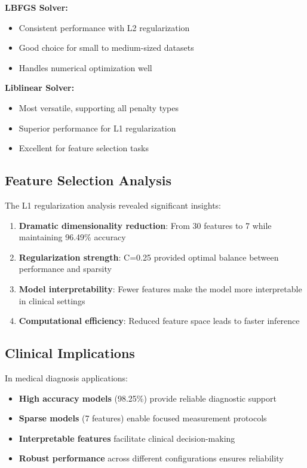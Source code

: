 \documentclass[12pt,a4paper]{article}
\begin{document}
\textbf{LBFGS Solver:}
\begin{itemize}
    \item Consistent performance with L2 regularization
    \item Good choice for small to medium-sized datasets
    \item Handles numerical optimization well
\end{itemize}

\textbf{Liblinear Solver:}
\begin{itemize}
    \item Most versatile, supporting all penalty types
    \item Superior performance for L1 regularization
    \item Excellent for feature selection tasks
\end{itemize}

\subsection{Feature Selection Analysis}

The L1 regularization analysis revealed significant insights:

\begin{enumerate}
    \item \textbf{Dramatic dimensionality reduction}: From 30 features to 7 while maintaining 96.49\% accuracy
    \item \textbf{Regularization strength}: C=0.25 provided optimal balance between performance and sparsity
    \item \textbf{Model interpretability}: Fewer features make the model more interpretable in clinical settings
    \item \textbf{Computational efficiency}: Reduced feature space leads to faster inference
\end{enumerate}

\subsection{Clinical Implications}

In medical diagnosis applications:
\begin{itemize}
    \item \textbf{High accuracy models} (98.25\%) provide reliable diagnostic support
    \item \textbf{Sparse models} (7 features) enable focused measurement protocols
    \item \textbf{Interpretable features} facilitate clinical decision-making
    \item \textbf{Robust performance} across different configurations ensures reliability
\end{itemize}
\end{document}
